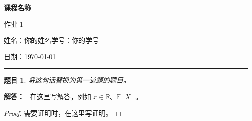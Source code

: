 \documentclass[11pt,a4paper]{ctexart}
\newcommand{\studentname}{你的姓名}
\newcommand{\studentid}{你的学号}
\newcommand{\coursename}{课程名称}
\newcommand{\assignmentnumber}{1}
\newcommand{\assignmentdate}{\today}
\newcommand{\R}{\mathbb{R}}
\newcommand{\E}{\mathbb{E}}
\newtheorem{problem}{题目}
\newenvironment{solution}
  {\par\noindent\textbf{解答：}\ }
  {\par\medskip}
\begin{document}
\begin{center}
  {\Large\bfseries \coursename}\par\medskip
  作业 \assignmentnumber\par\medskip
  姓名：\studentname\quad 学号：\studentid\par
  日期：\assignmentdate
\end{center}
\hrule
\bigskip

\begin{problem}
将这句话替换为第一道题的题目。
\end{problem}

\begin{solution}
在这里写解答，例如 $x \in \R$、$\E[X]$。
\begin{proof}
需要证明时，在这里写证明。
\end{proof}
\end{solution}

\end{document}
